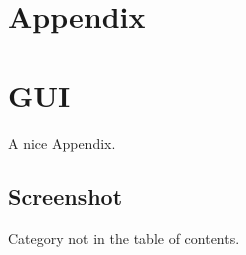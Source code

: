 \setcounter{page}{1}

\begin{appendix}
\section*{Appendix}
{}

\section{GUI}
A nice Appendix.

\subsection*{Screenshot}
\label{app:screenshot}
Category not in the table of contents.

\end{appendix}
